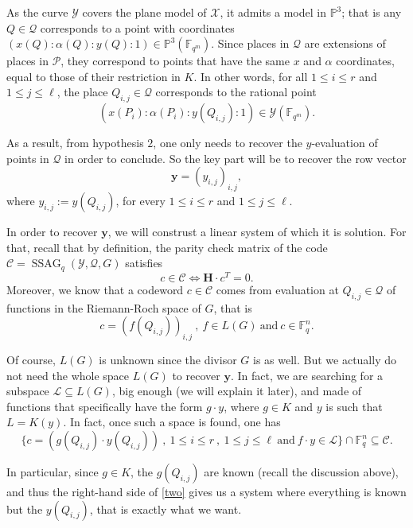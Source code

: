 \documentclass[10pt]{article}
\theoremstyle{definition}
\theoremstyle{definition}
\theoremstyle{definition}
\newcommand{\s}{\vspace{0.3cm}}
\newcommand{\cd}{\cdot}
\newcommand{\PP}{\mathbb{P}}
\newcommand{\fqm}{\mathbb{F}_{q^m}}
\newcommand{\fq}{\mathbb{F}_q}
\newcommand{\su}{\subseteq}
\newcommand{\X}{\mathcal{X}}
\newcommand{\Y}{\mathcal{Y}}
\newcommand{\PR}{\mathcal{P}}
\newcommand{\QR}{\mathcal{Q}}
\newcommand{\ssag}{\operatorname{SSAG}}
\begin{document}
As the curve $\Y$ covers the plane model of $\X$, it admits a model in $\PP^3$; that is any $Q \in \QR$ corresponds to a point with coordinates $(x(Q):\alpha(Q):y(Q):1) \in \PP^3(\fqm)$. Since places in $\QR$ are extensions of places in $\PR$, they correspond to points that have the same $x$ and $\alpha$ coordinates, equal to those of their restriction in $K$. In other words, for all $1 \leq i \leq r$ and $1 \leq j \leq \ell$, the place $Q_{i,j} \in \QR$ corresponds to the rational point
\[ (x(P_i):\alpha(P_i):y(Q_{i,j}):1) \in \Y(\fqm).\]

As a result, from hypothesis $2$, one only needs to recover the $y$-evaluation of points in $\QR$ in order to conclude. So the key part will be to recover the row vector
\begin{equation}
\textbf{y} = (y_{i,j})_{i,j},
\end{equation}
where $y_{i,j} := y(Q_{i,j})$, for every $1 \leq i \leq r$ and $1 \leq j \leq \ell$.

\s

In order to recover $\mathbf{y}$, we will construst a linear system of which it is solution. For that, recall that by definition, the parity check matrix of the code $\mathcal{C}=\ssag_q(\Y,\QR,G)$ satisfies
\begin{equation} \label{two}
c \in \mathcal{C} \iff \mathbf{H} \cd c^T = 0.
\end{equation}
Moreover, we know that a codeword $c \in \mathcal{C}$ comes from evaluation at $Q_{i,j} \in \QR$ of functions in the Riemann-Roch space of $G$, that is
\[c = (f(Q_{i,j}))_{i,j} \ , \ f \in L(G) \ \textrm{and} \ c \in \fq^n.\]

Of course, $L(G)$ is unknown since the divisor $G$ is as well. But we actually do not need the whole space $L(G)$ to recover $\mathbf{y}$. In fact, we are searching for a subspace $\mathcal{L} \su L(G)$, big enough (we will explain it later), and made of functions that specifically have the form $g \cd y$, where $g \in K$ and $y$ is such that $L=K(y)$. In fact, once such a space is found, one has 
\[\{c= (g(Q_{i,j}) \cd y(Q_{i,j})) \ , \ 1 \leq i \leq r \ , \ 1 \leq j \leq \ell \ \textrm{and} \ f\cd y \in \mathcal{L}\} \cap \fq^n \su \mathcal{C}.\] 

In particular, since $g \in K$, the $g(Q_{i,j})$ are known (recall the discussion above), and thus the right-hand side of \eqref{two} gives us a system where everything is known but the $y(Q_{i,j})$, that is exactly what we want.

\s
\end{document}
